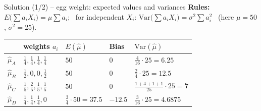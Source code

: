 \documentclass[aspectratio=169,11pt]{beamer}
\begin{document}
\begin{frame}{Solution (1/2) -- egg weight: expected values and variances}
  \textbf{Rules:} $E\bigl(\sum a_iX_i\bigr)=\mu\sum a_i$; \ for independent
  $X_i$: $\mathrm{Var}\bigl(\sum a_iX_i\bigr)=\sigma^2\sum a_i^2$ \ (here
  $\mu=50$, $\sigma^2=25$).
  \begin{center}
    \renewcommand{\arraystretch}{1.3}
    \begin{tabular}{@{}lllll@{}}
      \toprule
      & \textbf{weights $a_i$} & \textbf{$E(\hat\mu)$} & \textbf{Bias}
        & \textbf{$\mathrm{Var}(\hat\mu)$}\\
      \midrule
      $\hat\mu_A$ & $\tfrac14,\tfrac14,\tfrac14,\tfrac14$ & $50$ & $0$
        & $\tfrac{4}{16}\cdot25=\mathbf{6.25}$\\
      $\hat\mu_B$ & $\tfrac12,0,0,\tfrac12$ & $50$ & $0$
        & $\tfrac{2}{4}\cdot25=\mathbf{12.5}$\\
      $\hat\mu_C$ & $\tfrac15,\tfrac25,\tfrac15,\tfrac15$ & $50$ & $0$
        & $\tfrac{1+4+1+1}{25}\cdot25=\mathbf{7}$\\
      $\hat\mu_D$ & $\tfrac14,\tfrac14,\tfrac14,0$ & $\tfrac34\cdot50=37.5$
        & $\mathbf{-12.5}$ & $\tfrac{3}{16}\cdot25=\mathbf{4.6875}$\\
      \bottomrule
    \end{tabular}
  \end{center}
\end{frame}
\end{document}
